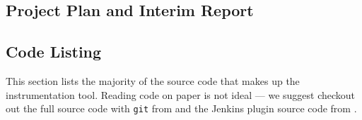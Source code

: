 \subsection{Project Plan and Interim Report}




\subsection{Code Listing}

This section lists the majority of the source code that makes up the \venera
instrumentation tool. Reading code on paper is not ideal --- we suggest checkout
out the full \venera source code with {\tt git} from
\cite{heisentestInstrumentation} and the Jenkins plugin source code from
\cite{heisentestPlugin}.

